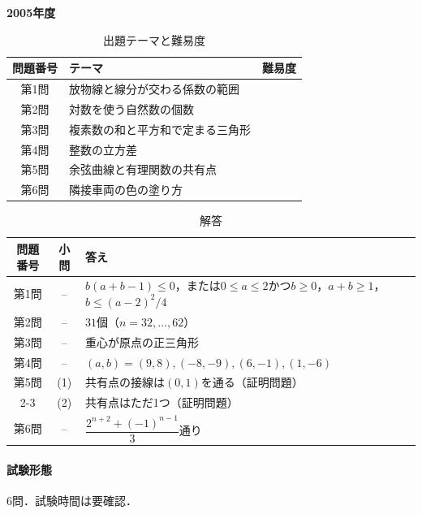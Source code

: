 \documentclass[../../main.tex]{subfiles}
\begin{document}
\begin{center}
  {\fontsize{48pt}{58pt}\selectfont \textbf{2005}\normalsize\textbf{年度}}
\end{center}

\begin{table}[htb]
  \centering
  \caption{出題テーマと難易度}
  \begin{tabular}{|c|p{9cm}|c|}
    \hline
    \textbf{問題番号} & \textbf{テーマ} & \textbf{難易度} \\
    \hline
    第1問 & 放物線と線分が交わる係数の範囲 & \\
    \hline
    第2問 & 対数を使う自然数の個数 & \\
    \hline
    第3問 & 複素数の和と平方和で定まる三角形 & \\
    \hline
    第4問 & 整数の立方差 & \\
    \hline
    第5問 & 余弦曲線と有理関数の共有点 & \\
    \hline
    第6問 & 隣接車両の色の塗り方 & \\
    \hline
  \end{tabular}
\end{table}

\begin{table}[htb]
  \centering
  \caption{解答}
  \renewcommand{\arraystretch}{1.4}
  \begin{tabular}{|c|c|p{9cm}|}
    \hline
    \textbf{問題番号} & \textbf{小問} & \textbf{答え} \\
    \hline
    第1問 & -- & $b(a+b-1)\le0$，または$0\le a\le2$かつ$b\ge0$，$a+b\ge1$，$b\le(a-2)^2/4$ \\
    \hline
    第2問 & -- & $31$個（$n=32,\ldots,62$） \\
    \hline
    第3問 & -- & 重心が原点の正三角形 \\
    \hline
    第4問 & -- & $(a,b)=(9,8),(-8,-9),(6,-1),(1,-6)$ \\
    \hline
    第5問 & (1) & 共有点の接線は$(0,1)$を通る（証明問題） \\
    \cline{2-3}
    & (2) & 共有点はただ1つ（証明問題） \\
    \hline
    第6問 & -- & $\dfrac{2^{n+2}+(-1)^{n-1}}{3}$通り \\
    \hline
  \end{tabular}
\end{table}

\paragraph{試験形態}
6問．試験時間は要確認．
\end{document}
